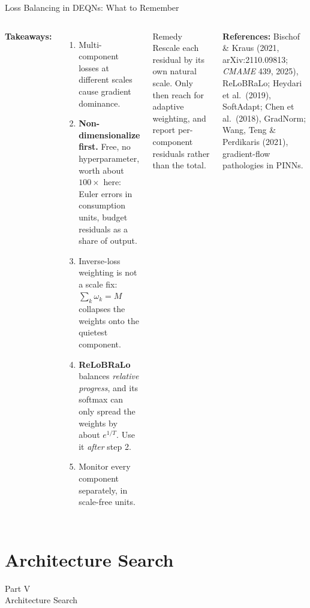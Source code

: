 \documentclass[aspectratio=169,11pt]{beamer}
\newcommand{\emphc}[1]{\textcolor{harvardcrimson}{#1}}
\begin{document}
\begin{frame}{Loss Balancing in DEQNs: What to Remember}
\begin{columns}[T]
\textbf{Takeaways:}
\begin{enumerate}\itemsep2pt\small
    \item Multi-component losses at different scales cause \emphc{gradient dominance}.
    \item \textbf{Non-dimensionalize first.} Free, no hyperparameter, worth about $100\times$ here: Euler errors in consumption units, budget residuals as a share of output.
    \item Inverse-loss weighting is \emphc{not} a scale fix: $\sum_k \omega_k = M$ collapses the weights onto the quietest component.
    \item \textbf{ReLoBRaLo} balances \emph{relative progress}, and its softmax can only spread the weights by about $e^{1/T}$. Use it \emph{after} step 2.
    \item \emphc{Monitor every component separately}, in scale-free units.
\end{enumerate}

\begin{exampleblock}{Remedy}
Rescale each residual by its own natural scale. Only then reach for adaptive weighting, and report per-component residuals rather than the total.
\end{exampleblock}

\vspace{0.2cm}
{\footnotesize \textbf{References:} Bischof \& Kraus (2021, arXiv:2110.09813; \emph{CMAME} 439, 2025), ReLoBRaLo; Heydari et al.\ (2019), SoftAdapt; Chen et al.\ (2018), GradNorm; Wang, Teng \& Perdikaris (2021), gradient-flow pathologies in PINNs.}
\end{columns}
\end{frame}


\section{Architecture Search}

\begin{frame}{}
\begin{center}
{\Huge \textcolor{uzhblue}{Part V}}\\[0.8em]
{\LARGE Architecture Search}
\end{center}
\end{frame}
\end{document}

